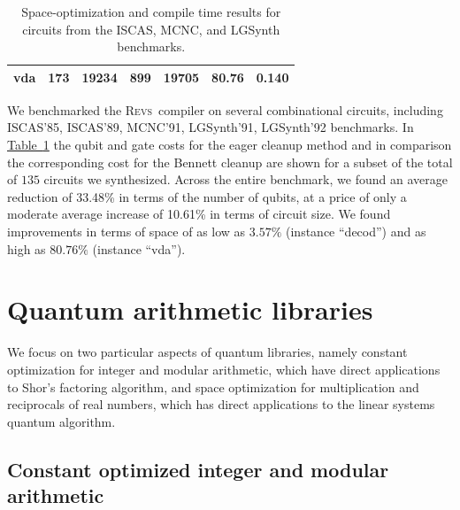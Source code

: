 \documentclass[conference]{IEEEtran}
\newcommand{\tab}[1]{\hyperref[tab:#1]{Table~\ref*{tab:#1}}}
\newcommand{\REVS}{{\textsc{Revs}}}
\begin{document}
\begin{table}[hbt]
\begin{tabular}{crrrrcc}
    vda             &       173     &       19234   &       899     &       19705   & 80.76       & 0.140 \\ %
\hline
  \end{tabular}
\bigskip
\caption{\label{tab:mcnc} Space-optimization and compile time results for circuits from the ISCAS, MCNC, and LGSynth benchmarks.}
\end{table}



We benchmarked the \REVS~compiler on several combinational circuits, including ISCAS'85, ISCAS'89, MCNC'91, LGSynth'91, LGSynth'92 benchmarks. In  \tab{mcnc}  the qubit and gate costs for the eager cleanup method and in comparison the corresponding cost for the Bennett cleanup are shown for a subset of the total of $135$ circuits we synthesized. Across the entire benchmark, we found an average reduction of 33.48\% in terms of the number of qubits, at a price of only a moderate average increase of 10.61\% in terms of circuit size.
We found improvements in terms of space of as low as $3.57\%$ (instance ``decod'') and as high as $80.76\%$ (instance ``vda''). 


\section{Quantum arithmetic libraries} %

We focus on two particular aspects of quantum libraries, namely constant optimization for integer and modular arithmetic, which have direct applications to Shor's factoring algorithm, and space optimization for multiplication and reciprocals of real numbers, which has direct applications to the linear systems quantum algorithm. 

\subsection{Constant optimized integer and modular arithmetic}
\end{document}
